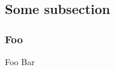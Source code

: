 \subsection{Some subsection} %
\label{sub:some_sub_section}
  \subsubsection{Foo} %
  \label{ssub:foo}
  Foo Bar
